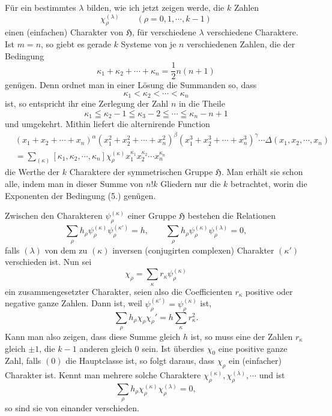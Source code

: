 \documentclass[11pt]{article}
\newcommand{\Hgr}{\mathfrak{H}}
\begin{document}
Für ein bestimmtes $\lambda$ bilden, wie ich jetzt zeigen werde, die $k$ Zahlen
\[
 \chi_\rho^{(\lambda)}\qquad(\rho=0,1,\cdots,k-1)
\]
einen (einfachen) Charakter von $\Hgr$, für verschiedene $\lambda$ verschiedene Charaktere. Ist $m=n$, so giebt es gerade $k$ Systeme von je $n$ verschiedenen Zahlen, die der Bedingung
\begin{equation}\tag{4.}
 \kappa_1+\kappa_2+\cdots+\kappa_n=\frac12 n(n+1)
\end{equation}
genügen. Denn ordnet man in einer Lösung die Summanden so, dass
\begin{equation}\tag{5.}
 \kappa_1<\kappa_2<\cdots<\kappa_n
\end{equation}
ist, so entspricht ihr eine Zerlegung der Zahl $n$ in die Theile
\[
 \kappa_1\leqq \kappa_2-1\leqq \kappa_3-2\leqq\cdots\leqq\kappa_n-n+1
\]
und umgekehrt. Mithin liefert die alternirende Function
\begin{equation}\tag{6.}
\begin{aligned}
 &(x_1+x_2+\cdots+x_n)^\alpha(x_1^2+x_2^2+\cdots+x_n^2)^\beta(x_1^3+x_2^3+\cdots+x_n^3)^\gamma\cdots\Delta(x_1,x_2,\cdots,x_n)\\
 &=\sum_{(\kappa)}[\kappa_1,\kappa_2,\cdots,\kappa_n]\chi_\rho^{(\kappa)}x_1^{\kappa_1}x_2^{\kappa_2}\cdots x_n^{\kappa_n}
\end{aligned}
\end{equation}
die Werthe der $k$ Charaktere der symmetrischen Gruppe $\Hgr$. Man erhält sie schon alle, indem man in dieser Summe von $n!k$ Gliedern nur die $k$ betrachtet, worin die Exponenten der Bedingung (5.) genügen.

Zwischen den Charakteren $\psi_\rho^{(\kappa)}$ einer Gruppe $\Hgr$ bestehen die Relationen
\begin{equation}\tag{7.}
 \sum_\rho h_\rho\psi_\rho^{(\kappa)}\psi_\rho^{(\kappa')}=h,
 \qquad
 \sum_\rho h_\rho\psi_\rho^{(\kappa)}\psi_\rho^{(\lambda)}=0,
\end{equation}
falls $(\lambda)$ von dem zu $(\kappa)$ inversen (conjugirten complexen) Charakter $(\kappa')$ verschieden ist. Nun sei
\[
 \chi_\rho=\sum_\kappa r_\kappa\psi_\rho^{(\kappa)}
\]
ein zusammengesetzter Charakter, seien also die Coefficienten $r_\kappa$ positive oder negative ganze Zahlen. Dann ist, weil $\psi_\rho^{(\kappa')}=\psi_\rho^{(\kappa)}$ ist,
\[
 \sum_\rho h_\rho\chi_\rho\chi_\rho'=h\sum_\kappa r_\kappa^2.
\]
Kann man also zeigen, dass diese Summe gleich $h$ ist, so muss eine der Zahlen $r_\kappa$ gleich $\pm1$, die $k-1$ anderen gleich $0$ sein. Ist überdies $\chi_0$ eine positive ganze Zahl, falls $(0)$ die Hauptclasse ist, so folgt daraus, dass $\chi_\rho$ ein (einfacher) Charakter ist. Kennt man mehrere solche Charaktere $\chi_\rho^{(\kappa)},\chi_\rho^{(\lambda)},\cdots$ und ist
\[
 \sum_\rho h_\rho\chi_\rho^{(\kappa)}\chi_\rho^{(\lambda)}=0,
\]
so sind sie von einander verschieden.
\end{document}
